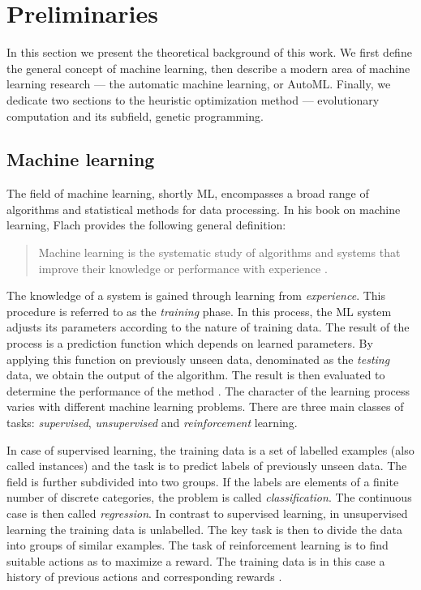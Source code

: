 \chapter{Preliminaries} \label{ch1:prelim}

In this section we present the theoretical background of this work. We first
define the general concept of machine learning, then describe a modern area
of machine learning research --- the automatic machine learning, or AutoML.
Finally, we dedicate two sections to the heuristic optimization method ---
evolutionary computation and its subfield, genetic programming.

\section{Machine learning} \label{sec:ml}
The field of machine learning, shortly ML, encompasses a broad range of
algorithms and statistical methods for data processing. In his book on machine
learning, Flach provides the following general definition:

\blockquote{Machine learning is the systematic study of algorithms and systems
that improve their knowledge or performance with experience
\citep{Flach:2012:MLA:2490546}.}

The knowledge of a system is gained through learning from \emph{experience}.
This procedure is referred to as the \emph{training} phase. In this process, 
the ML system adjusts its parameters according to the nature of training data.
The result of the process is a prediction function which depends on learned
parameters. By applying this function on previously unseen data, denominated 
as the \emph{testing} data, we obtain the output of the algorithm. The 
result is then evaluated to determine the performance of the method 
\citep[p.~2]{Bishop:2006:PRM:1162264}. The character of the learning process
varies with different machine learning problems. There are three main classes 
of tasks: \emph{supervised}, \emph{unsupervised} and \emph{reinforcement} 
learning.

In case of supervised learning, the training data is a set of labelled examples
(also called instances)
and the task is to predict labels of previously unseen data. The field is 
further subdivided into two groups. If the labels are elements of a finite 
number of discrete categories, the problem is called \emph{classification}. 
The continuous case is then called \emph{regression}.
In contrast to supervised learning, in unsupervised learning the training data 
is unlabelled. The key task is then to divide the data into groups of 
similar examples. The task of reinforcement learning is to find suitable
actions as to maximize a reward. The training data is in this case a history of
previous actions and corresponding rewards \citep[p.~3]{Bishop:2006:PRM:1162264}.

